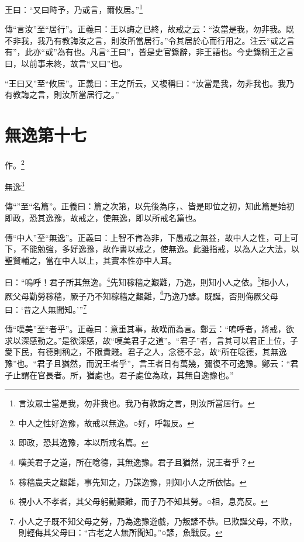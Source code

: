 王曰：“又曰時予，乃或言，爾攸居。”\footnote{言汝眾士當是我，勿非我也。我乃有教誨之言，則汝所當居行。}


{\noindent\zhuan{}\fzbyks 傳“言汝”至“居行”。正義曰：王以誨之已終，故戒之云：“汝當是我，勿非我。既不非我，我乃有教誨汝之言，則汝所當居行。”令其居於心而行用之。注云“或之言有”，此亦“或”為有也。凡言“王曰”，皆是史官錄辭，非王語也。今史錄稱王之言曰，以前事未終，故言“又曰”也。 \par}

{\noindent\shu{}\fzkt “王曰又”至“攸居”。正義曰：王之所云，又複稱曰：“汝當是我，勿非我也。我乃有教誨之言，則汝所當居行之。” \par}

\section{無逸第十七}


作。\footnote{中人之性好逸豫，故戒以無逸。○好，呼報反。}

無逸\footnote{即政，恐其逸豫，本以所戒名篇。}


{\noindent\zhuan{}\fzbyks 傳“”至“名篇”。正義曰：篇之次第，以先後為序，、皆是即位之初，知此篇是始初即政，恐其逸豫，故戒之，使無逸，即以所戒名篇也。 \par}

{\noindent\shu{}\fzkt 傳“中人”至“無逸”。正義曰：上智不肯為非，下愚戒之無益，故中人之性，可上可下，不能勉強，多好逸豫，故作書以戒之，使無逸。此雖指戒，以為人之大法，以聖賢輔之，當在中人以上，其實本性亦中人耳。 \par}

曰：“嗚呼！君子所其無逸。\footnote{嘆美君子之道，所在唸德，其無逸豫。君子且猶然，況王者乎？}先知稼穡之艱難，乃逸，則知小人之依。\footnote{稼穡農夫之艱難，事先知之，乃謀逸豫，則知小人之所依怙。}相小人，厥父母勤勞稼穡，厥子乃不知稼穡之艱難，\footnote{視小人不孝者，其父母躬勤艱難，而子乃不知其勞。○相，息亮反。}乃逸乃諺。既誕，否則侮厥父母曰：‘昔之人無聞知。’”\footnote{小人之子既不知父母之勞，乃為逸豫遊戲，乃叛諺不恭。已欺誕父母，不欺，則輕侮其父母曰：“古老之人無所聞知。”○諺，魚戰反。}


{\noindent\zhuan{}\fzbyks 傳“嘆美”至“者乎”。正義曰：意重其事，故嘆而為言。鄭云：“嗚呼者，將戒，欲求以深感動之。”是欲深感，故“嘆美君子之道”。“君子”者，言其可以君正上位，子愛下民，有德則稱之，不限貴賤。君子之人，念德不怠，故“所在唸德，其無逸豫”也。“君子且猶然，而況王者乎”，言王者日有萬幾，彌復不可逸豫。鄭云：“君子止謂在官長者。所，猶處也。君子處位為政，其無自逸豫也。” \par}

